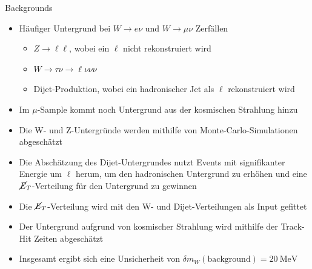 \documentclass[aspectratio=1610, 9pt]{beamer}
\begin{document}
\begin{frame}{Backgrounds}
  \begin{itemize}
    \item Häufiger Untergrund bei $W \rightarrow e \nu$ und $W \rightarrow \mu \nu$ Zerfällen
    \begin{itemize}
      \item $Z \rightarrow \ell \ell$, wobei ein $\ell$ nicht rekonstruiert wird
      \item $W \rightarrow \tau \nu \rightarrow \ell \nu \nu \nu$
      \item Dijet-Produktion, wobei ein hadronischer Jet als $\ell$ rekonstruiert wird
    \end{itemize}
    \item Im $\mu$-Sample kommt noch Untergrund aus der kosmischen Strahlung hinzu
  \end{itemize}
%
%


\end{frame}
\begin{frame}
  \begin{itemize}
    \item Die W- und Z-Untergründe werden mithilfe von Monte-Carlo-Simulationen abgeschätzt
    \item Die Abschätzung des Dijet-Untergrundes nutzt Events mit signifikanter Energie um $\ell$ herum, um den hadronischen Untergrund zu erhöhen und eine $\cancel{\it{E}}_{T}$-Verteilung für den Untergrund zu gewinnen
    \item[\rightarrow] Die $\cancel{\it{E}}_{T}$-Verteilung wird mit den W- und Dijet-Verteilungen als Input gefittet
    \item Der Untergrund aufgrund von kosmischer Strahlung wird mithilfe der Track-Hit Zeiten abgeschätzt
    \item Insgesamt ergibt sich eine Unsicherheit von $\delta m_W (\text{background}) = \SI{20}{\MeV}$
  \end{itemize}
\end{frame}
\end{document}

